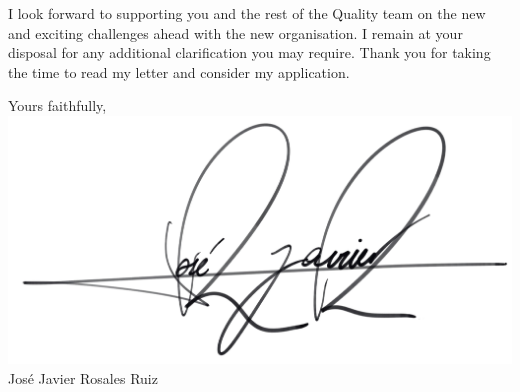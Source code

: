 \documentclass[11pt,a4paper]{letter}
\begin{document}
{ 
 

I look forward to supporting you and the rest of the Quality team on the new and exciting challenges ahead with the new organisation. I remain at your disposal for any additional clarification you may require. Thank you for taking the time to read my letter and consider my application.

}

\vspace{15pt}

Yours faithfully,
\vspace{10pt} 
\newline
\includegraphics[scale=0.1]{Images/signature.png} \vspace{6pt} \newline
José Javier Rosales Ruiz

 
\end{document}
